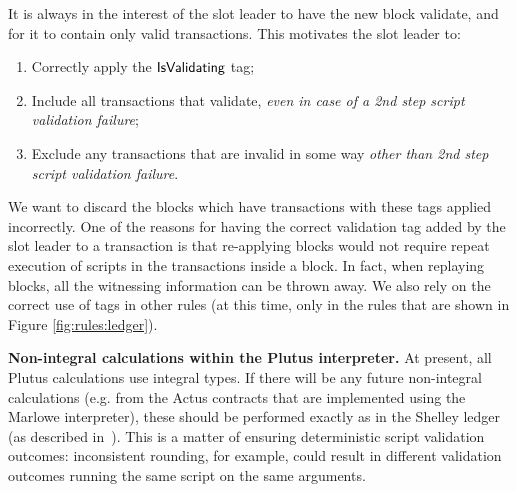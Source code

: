 It is always in the interest of the slot leader to have the new block validate,
and for it to contain only valid transactions. This motivates the
slot leader to:

\begin{enumerate}
  \item Correctly apply the $\mathsf{IsValidating}$ tag;
  \item Include all transactions that validate,
  \textit{even in case of a 2nd step script validation failure};
  \item Exclude any transactions that are invalid in some way \textit{other than 2nd step script validation failure}.
\end{enumerate}

We want to
discard the blocks which have transactions with these tags
applied incorrectly.
One of the reasons for having the correct validation tag added by the slot leader
to a transaction is that re-applying blocks would not require repeat
execution of scripts in the transactions inside a block. In fact, when replaying
blocks, all the witnessing information can be thrown away.
We also rely on the correct use of tags in other rules (at this time, only in
the rules that are shown in Figure \ref{fig:rules:ledger}).


\textbf{Non-integral calculations within the Plutus interpreter.} At present, all Plutus calculations use integral types. If there
will be any future non-integral calculations (e.g. from the Actus contracts that are implemented using
the Marlowe interpreter), these should
be performed exactly as in the Shelley ledger (as described in~\cite{non_int}). This is a matter of
ensuring deterministic script validation outcomes: inconsistent rounding, for example, could
result in different validation outcomes running the same script on the same
arguments.


